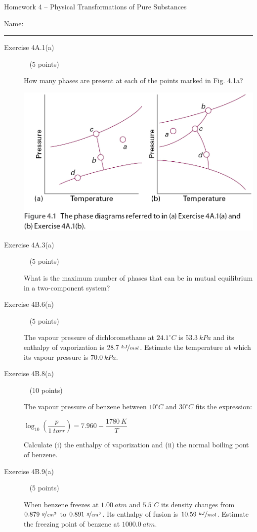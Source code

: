 \documentclass[12pt, openany, letterpaper]{memoir}
\begin{document}
\begin{center}
	{\large Homework 4 -- Physical Transformations of Pure Substances}
\end{center}

Name: \rule[-.1mm]{15em}{0.1pt}

\begin{description}	
	\item [Exercise 4A.1(a)] ~ (5 points)
	
	How many phases are present at each of the points marked in Fig. 4.1a?
	
	\noindent\includegraphics[width=0.5\linewidth]{Phase_Diagrams}
	\item [Exercise 4A.3(a)] ~ (5 points)
	
	What is the maximum number of phases that can be in mutual equilibrium in a two-component system?
	
	\vspace{10em}
	\item [Exercise 4B.6(a)] ~ (5 points)
	
	The vapour pressure of dichloromethane at $24.1^\circ C$ is $53.3~kPa$ and its enthalpy of vaporization is $28.7~\nicefrac{kJ}{mol}$. Estimate the temperature at which its vapour pressure is $70.0~kPa$.
	

	
	\vspace{12em}
	\item [Exercise 4B.8(a)] ~ (10 points)
	
	The vapour pressure of benzene between $10^\circ C$ and $30^\circ C$ fits the expression:
	
	 $\log_{10}\left(\dfrac{p}{1~torr}\right) = 7.960-\dfrac{1780~K}{T}$ 
	 
	 Calculate (i) the enthalpy of vaporization and (ii) the normal boiling pont of benzene.
	
	\vspace{21em}
	\item [Exercise 4B.9(a)] ~ (5 points)
	
	When benzene freezes at $1.00~atm$ and $5.5^\circ C$ its density changes from $0.879~\nicefrac{g}{cm^3}$ to $0.891~\nicefrac{g}{cm^3}$. Its enthalpy of fusion is $10.59~\nicefrac{kJ}{mol}$. Estimate the freezing point of benzene at $1000.0~atm$.
	
	\vspace{15em}	
\end{description}
\end{document}
